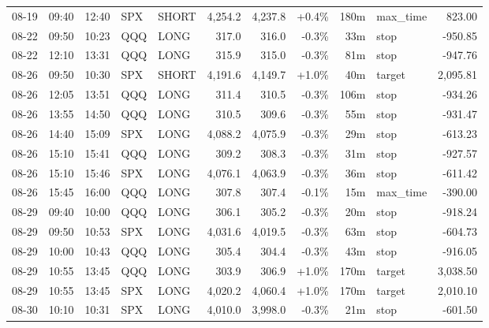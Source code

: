 \documentclass[11pt,a4paper,twoside]{article}
\begin{document}
\begin{center}
\begin{longtable}{>{\color{txtmain}}l l l l l r r r r >{\color{txtmain}}l r}
08-19 & 09:40 & 12:40 & SPX & SHORT & 4,254.2 & 4,237.8 & \textcolor{wingreen}{+0.4\%} & 180m & max\_time & \textcolor{wingreen}{823.00} \\
08-22 & 09:50 & 10:23 & QQQ & LONG & 317.0 & 316.0 & \textcolor{lossred}{-0.3\%} & 33m & stop & \textcolor{lossred}{-950.85} \\
08-22 & 12:10 & 13:31 & QQQ & LONG & 315.9 & 315.0 & \textcolor{lossred}{-0.3\%} & 81m & stop & \textcolor{lossred}{-947.76} \\
08-26 & 09:50 & 10:30 & SPX & SHORT & 4,191.6 & 4,149.7 & \textcolor{wingreen}{+1.0\%} & 40m & target & \textcolor{wingreen}{2,095.81} \\
08-26 & 12:05 & 13:51 & QQQ & LONG & 311.4 & 310.5 & \textcolor{lossred}{-0.3\%} & 106m & stop & \textcolor{lossred}{-934.26} \\
08-26 & 13:55 & 14:50 & QQQ & LONG & 310.5 & 309.6 & \textcolor{lossred}{-0.3\%} & 55m & stop & \textcolor{lossred}{-931.47} \\
08-26 & 14:40 & 15:09 & SPX & LONG & 4,088.2 & 4,075.9 & \textcolor{lossred}{-0.3\%} & 29m & stop & \textcolor{lossred}{-613.23} \\
08-26 & 15:10 & 15:41 & QQQ & LONG & 309.2 & 308.3 & \textcolor{lossred}{-0.3\%} & 31m & stop & \textcolor{lossred}{-927.57} \\
08-26 & 15:10 & 15:46 & SPX & LONG & 4,076.1 & 4,063.9 & \textcolor{lossred}{-0.3\%} & 36m & stop & \textcolor{lossred}{-611.42} \\
08-26 & 15:45 & 16:00 & QQQ & LONG & 307.8 & 307.4 & \textcolor{lossred}{-0.1\%} & 15m & max\_time & \textcolor{lossred}{-390.00} \\
08-29 & 09:40 & 10:00 & QQQ & LONG & 306.1 & 305.2 & \textcolor{lossred}{-0.3\%} & 20m & stop & \textcolor{lossred}{-918.24} \\
08-29 & 09:50 & 10:53 & SPX & LONG & 4,031.6 & 4,019.5 & \textcolor{lossred}{-0.3\%} & 63m & stop & \textcolor{lossred}{-604.73} \\
08-29 & 10:00 & 10:43 & QQQ & LONG & 305.4 & 304.4 & \textcolor{lossred}{-0.3\%} & 43m & stop & \textcolor{lossred}{-916.05} \\
08-29 & 10:55 & 13:45 & QQQ & LONG & 303.9 & 306.9 & \textcolor{wingreen}{+1.0\%} & 170m & target & \textcolor{wingreen}{3,038.50} \\
08-29 & 10:55 & 13:45 & SPX & LONG & 4,020.2 & 4,060.4 & \textcolor{wingreen}{+1.0\%} & 170m & target & \textcolor{wingreen}{2,010.10} \\
08-30 & 10:10 & 10:31 & SPX & LONG & 4,010.0 & 3,998.0 & \textcolor{lossred}{-0.3\%} & 21m & stop & \textcolor{lossred}{-601.50} \\

\end{longtable}
\end{center}
\end{document}
